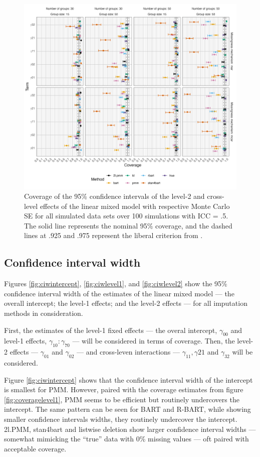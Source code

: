 \documentclass[10pt, a4paper, titlepage]{article}
\begin{document}
\begin{figure}[H]
    \centering
    \includegraphics[width=1\textwidth]{coveragelevel2.png}
    \caption{Coverage of the 95\% confidence intervals of the level-2 and cross-level effects of the linear mixed model with respective Monte Carlo SE for all simulated data sets over 100 simulations with ICC = .5. The solid line represents the nominal 95\% coverage, and the dashed lines at .925 and .975 represent the liberal criterion from \citet{bradley1978}.}
    \label{fig:coveragelevel2}
\end{figure}

\subsection{Confidence interval width}
Figures \ref{fig:ciwintercept}, \ref{fig:ciwlevel1}, and \ref{fig:ciwlevel2} show the 95\% confidence interval width of the estimates of the linear mixed model --- the overall intercept; the level-1 effects; and the level-2 effects --- for all imputation methods in consideration.

First, the estimates of the level-1 fixed effects --- the overal intercept, $\gamma_{00}$ and level-1 effects, $\gamma_{10}:\gamma_{70}$ --- will be considered in terms of coverage. Then, the level-2 effects --- $\gamma_{01}$ and $\gamma_{02}$ --- and cross-leven interactions --- $\gamma_{11}, \gamma{21}$ and $\gamma_{32}$ will be considered.

Figure \ref{fig:ciwintercept} shows that the confidence interval width of the intercept is smallest for PMM. However, paired with the coverage estimates from figure \ref{fig:coveragelevel1}, PMM seems to be efficient but routinely undercovers the intercept. The same pattern can be seen for BART and R-BART, while showing smaller confidence intervals widths, they routinely undercover the intercept. 2l.PMM, stan4bart and listwise deletion show larger confidence interval widths --- somewhat mimicking the ``true'' data with 0\% missing values --- oft paired with acceptable coverage.
\end{document}

